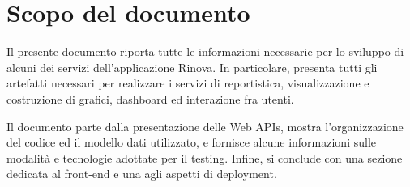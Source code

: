 \setcounter{section}{0}
\setlength{\parindent}{0pt}
\setlength{\parskip}{6pt}
\setlength{\itemsep}{3pt}

\section{Scopo del documento}
Il presente documento riporta tutte le informazioni necessarie per lo sviluppo di alcuni dei servizi dell'applicazione Rinova. In particolare, presenta tutti gli artefatti necessari per realizzare i servizi di reportistica, visualizzazione e costruzione di grafici, dashboard ed interazione fra utenti. 

Il documento parte dalla presentazione delle Web APIs, mostra l'organizzazione del codice ed il modello dati utilizzato, e fornisce alcune informazioni sulle modalità e tecnologie adottate per il testing. Infine, si conclude con una sezione dedicata al front-end e una agli aspetti di deployment.